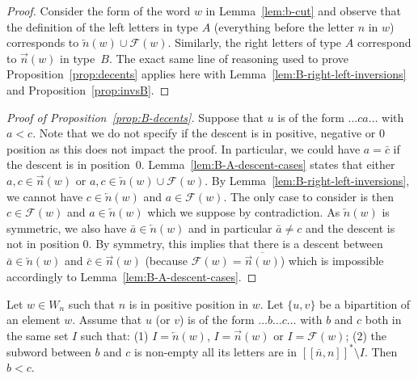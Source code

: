 \documentclass[ALCO,Unicode]{cedram}
\theoremstyle{definition}
\newcommand{\R}{{\overrightarrow{n}}}
\newcommand{\LL}{{\overleftarrow{n}}}
\newcommand{\Bsetnn}{[\![\bar{n},n ]\!]^*}
\newcommand{\F}{\mathcal{F}}
\begin{document}
\begin{proof}
Consider the form of the word $w$ in Lemma~\ref{lem:b-cut} and observe that the definition of the left letters in type $A$ (everything before the letter $n$ in $w$) corresponds to $\LL(w) \cup \F(w)$. Similarly, the right letters of type $A$ correspond to $\R(w)$ in type~$B$. The exact same line of reasoning used to prove Proposition~\ref{prop:decents} applies here with Lemma~\ref{lem:B-right-left-inversions} and Proposition~\ref{prop:invsB}.
\end{proof}

\begin{proof}[Proof of Proposition~\ref{prop:B-decents}]
Suppose that $u$ is of the form $\dots ca \dots$ with $a < c$. Note that we do not specify if the descent is in positive, negative or $0$ position as this does not impact the proof. In particular, we could have $a = \bar c$ if the descent is in position~$0$.  Lemma~\ref{lem:B-A-descent-cases} states that either $a,c \in \R(w)$ or $a,c \in \LL(w) \cup \F(w)$. By Lemma~\ref{lem:B-right-left-inversions}, we cannot have $c \in \LL(w)$ and $a \in \F(w)$. The only case to consider is then $c \in \F(w)$ and $a \in \LL(w)$ which we suppose by contradiction. As $\LL(w)$ is symmetric, we also have $\bar a \in \LL(w)$ and in particular $\bar a \neq c$ and the descent is not in position $0$. By symmetry, this implies that there is a descent between $\bar a \in \LL(w)$ and $\bar c \in \R(w)$ (because $\F(w) = \overline{\R(w)}$) which is impossible accordingly to Lemma~\ref{lem:B-A-descent-cases}.
\end{proof}

\begin{prop}
\label{prop:B-no-extra-desc}
Let $w\in W_n$ such that $n$ is in positive position in $w$. Let $\lbrace u, v \rbrace$ be a bipartition of an element $w$.  Assume that $u$ (or $v$) is of the form $\dots b \dots c \dots$ with $b$ and $c$  both in the same set $I$ such that: (1)  $I=\LL(w)$, $I=\R(w)$ or $I=\F(w)$; (2) the subword between $b$ and $c$ is non-empty  all its letters are in $\Bsetnn\setminus I$. Then $b < c$.
\end{prop}
\end{document}
